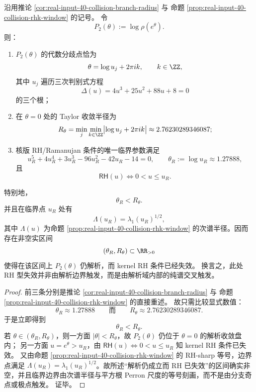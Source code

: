 \begin{theorem}\label{thm:xi-rh-critical-before-nearest-complex-branch}
沿用推论 \ref{cor:real-input-40-collision-branch-radius} 与
命题 \ref{prop:real-input-40-collision-rhk-window} 的记号。
令
\[
P_2(\theta):=\log \rho(e^\theta).
\]
则：
\begin{enumerate}
  \item \(P_2(\theta)\) 的代数分歧点恰为
  \[
  \theta=\log u_j+2\pi i k,\qquad k\in\ZZ,
  \]
  其中 \(u_j\) 遍历三次判别式方程
  \[
  \Delta(u)=4u^3+25u^2+88u+8=0
  \]
  的三个根；
  \item 在 \(\theta=0\) 处的 Taylor 收敛半径为
  \[
  R_\theta=\min_j\min_{k\in\ZZ}\bigl|\log u_j+2\pi i k\bigr|
  \approx 2.76230289346087;
  \]
  \item 核版 RH/Ramanujan 条件的唯一临界参数满足
  \[
  u_R^5+4u_R^4+3u_R^3-96u_R^2-42u_R-14=0,
  \qquad
  \theta_R:=\log u_R\approx 1.27888,
  \]
  且
  \[
  \textsf{RH}(u)\Longleftrightarrow 0<u\le u_R.
  \]
\end{enumerate}
特别地，
\[
\boxed{\;
\theta_R<R_\theta.\;}
\]
并且在临界点 \(u_R\) 处有
\[
\Lambda(u_R)=\lambda_1(u_R)^{1/2},
\]
其中 \(\Lambda(u)\) 为命题 \ref{prop:real-input-40-collision-rhk-window} 的次谱半径。因而存在非空实区间
\[
(\theta_R,R_\theta)\subset \RR_{>0}
\]
使得在该区间上 \(P_2(\theta)\) 仍解析，而 kernel RH 条件已经失效。
换言之，此处 RH 型失效并非由解析边界触发，而是由解析域内部的纯谱交叉触发。
\end{theorem}
\begin{proof}
前三条分别是推论 \ref{cor:real-input-40-collision-branch-radius} 与
命题 \ref{prop:real-input-40-collision-rhk-window} 的直接重述。
故只需比较显式数值：
\[
\theta_R\approx 1.27888
\qquad\text{而}\qquad
R_\theta\approx 2.76230289346087.
\]
于是立即得到
\[
\theta_R<R_\theta.
\]
若 \(\theta\in(\theta_R,R_\theta)\)，则一方面 \(|\theta|<R_\theta\)，故
\(P_2(\theta)\) 仍位于 \(\theta=0\) 的解析收敛盘内；
另一方面 \(u=e^\theta>u_R\)，由
\(
\textsf{RH}(u)\Longleftrightarrow 0<u\le u_R
\)
知 kernel RH 条件已失效。
又由命题 \ref{prop:real-input-40-collision-rhk-window} 的 RH-sharp 等号，边界点满足
\(\Lambda(u_R)=\lambda_1(u_R)^{1/2}\)。故所述“解析仍成立而 RH 已失效”的区间确实非空，并且临界边界由次谱半径与平方根 Perron 尺度的等号刻画，而不是由分支奇点或极点触发。
证毕。
\end{proof}
